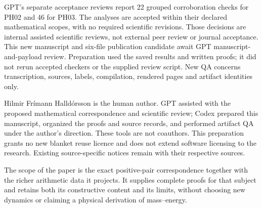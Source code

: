 \documentclass[11pt,a4paper]{article}
\begin{document}
GPT's separate acceptance reviews report 22 grouped corroboration checks for PH02 and 46 for PH03. The analyses are accepted within their declared mathematical scopes, with no required scientific revisions. Those decisions are internal assisted scientific reviews, not external peer review or journal acceptance. This new manuscript and six-file publication candidate await GPT manuscript-and-payload review. Preparation used the saved results and written proofs; it did not rerun accepted checkers or the supplied review script. New QA concerns transcription, sources, labels, compilation, rendered pages and artifact identities only.

Hilmir Frímann Halldórsson is the human author. GPT assisted with the proposed mathematical correspondence and scientific review; Codex prepared this manuscript, organized the proofs and source records, and performed artifact QA under the author's direction. These tools are not coauthors. This preparation grants no new blanket reuse licence and does not extend software licensing to the research. Existing source-specific notices remain with their respective sources.

The scope of the paper is the exact positive-pair correspondence together with the richer arithmetic data it projects. It supplies complete proofs for that subject and retains both its constructive content and its limits, without choosing new dynamics or claiming a physical derivation of mass--energy.
\end{document}
